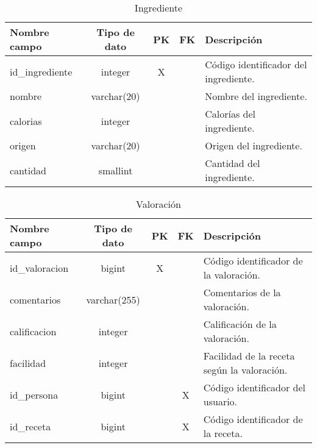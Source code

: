 \documentclass[12pt,a4paper]{article}
\begin{document}
\begin{table}[h!]
\centering
\begin{tabular}{|l|c|c|c|l|}
\hline
\textbf{Nombre campo}      & \textbf{Tipo de dato} & \textbf{PK} & \textbf{FK} & \textbf{Descripción} \\
\hline
id\_ingrediente            & integer               & X           &             & Código identificador del ingrediente. \\
nombre                     & varchar(20)           &             &             & Nombre del ingrediente. \\
calorias                   & integer               &             &             & Calorías del ingrediente. \\
origen                     & varchar(20)           &             &             & Origen del ingrediente. \\
cantidad                   & smallint              &             &             & Cantidad del ingrediente. \\
\hline
\end{tabular}
\caption{Ingrediente}
\label{table:ingrediente}
\end{table}

\begin{table}[h!]
\centering
\begin{tabular}{|l|c|c|c|l|}
\hline
\textbf{Nombre campo}      & \textbf{Tipo de dato} & \textbf{PK} & \textbf{FK} & \textbf{Descripción} \\
\hline
id\_valoracion             & bigint                & X           &             & Código identificador de la valoración. \\
comentarios                & varchar(255)          &             &             & Comentarios de la valoración. \\
calificacion               & integer               &             &             & Calificación de la valoración. \\
facilidad                  & integer               &             &             & Facilidad de la receta según la valoración. \\
id\_persona                & bigint                &             & X           & Código identificador del usuario. \\
id\_receta                 & bigint                &             & X           & Código identificador de la receta. \\
\hline
\end{tabular}
\caption{Valoración}
\label{table:valoracion}
\end{table}
\end{document}
